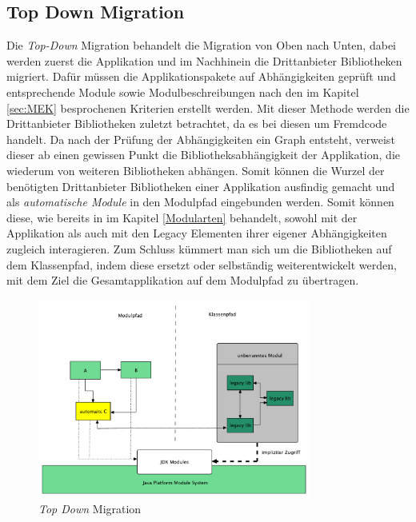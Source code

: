 \subsection{Top Down Migration}
	Die \textit{Top-Down} Migration behandelt die Migration von Oben nach Unten, dabei werden zuerst die Applikation und im Nachhinein die Drittanbieter Bibliotheken migriert. Dafür müssen die Applikationspakete auf Abhängigkeiten geprüft und entsprechende Module sowie Modulbeschreibungen nach den im Kapitel \ref{sec:MEK} besprochenen Kriterien erstellt werden. Mit dieser Methode werden die Drittanbieter Bibliotheken zuletzt betrachtet, da es bei diesen um Fremdcode handelt. \newline
	Da nach der Prüfung der Abhängigkeiten ein Graph entsteht, verweist dieser ab einen gewissen Punkt die Bibliotheksabhängigkeit der Applikation, die wiederum von weiteren Bibliotheken abhängen. Somit können die Wurzel der benötigten Drittanbieter Bibliotheken einer Applikation ausfindig gemacht und als \textit{automatische Module} in den Modulpfad eingebunden werden. Somit können diese, wie bereits in im Kapitel \ref{Modularten} behandelt, sowohl mit der Applikation als auch mit den Legacy Elementen ihrer eigener Abhängigkeiten zugleich interagieren. Zum Schluss kümmert man sich um die Bibliotheken auf dem Klassenpfad, indem diese ersetzt oder selbständig weiterentwickelt werden, mit dem Ziel die Gesamtapplikation auf dem Modulpfad zu übertragen. \cite{javaMod9,modulProgJava9,java9modRevealed,modulMitJava9,masteringJava9}\bigbreak
	\begin{figure}[h]
		\centering
	    \includegraphics[width=0.8\textwidth]{material/images/top-down-migrate.pdf}
	    \caption{\textit{Top Down} Migration}
	    \label{fig:TDM}
  	\end{figure}

